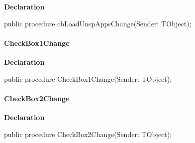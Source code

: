 \documentclass{report}
\newif\ifpdf
\begin{document}
\label{settings.TForm2-cbLoadUnspAppsChange}
\begin{list}{}{
\setlength{\itemindent}{0cm}
\setlength{\listparindent}{0cm}
\setlength{\leftmargin}{\evensidemargin}
\addtolength{\leftmargin}{\tmplength}
\settowidth{\labelsep}{X}
\addtolength{\leftmargin}{\labelsep}
\setlength{\labelwidth}{\tmplength}
}
\item[\textbf{Declaration}\hfill]
\ifpdf
\begin{flushleft}
\fi
\begin{ttfamily}
public procedure cbLoadUnspAppsChange(Sender: TObject);\end{ttfamily}

\ifpdf
\end{flushleft}
\fi

\end{list}
\paragraph*{CheckBox1Change}\hspace*{\fill}

\label{settings.TForm2-CheckBox1Change}
\begin{list}{}{
\setlength{\itemindent}{0cm}
\setlength{\listparindent}{0cm}
\setlength{\leftmargin}{\evensidemargin}
\addtolength{\leftmargin}{\tmplength}
\settowidth{\labelsep}{X}
\addtolength{\leftmargin}{\labelsep}
\setlength{\labelwidth}{\tmplength}
}
\item[\textbf{Declaration}\hfill]
\ifpdf
\begin{flushleft}
\fi
\begin{ttfamily}
public procedure CheckBox1Change(Sender: TObject);\end{ttfamily}

\ifpdf
\end{flushleft}
\fi

\end{list}
\paragraph*{CheckBox2Change}\hspace*{\fill}

\label{settings.TForm2-CheckBox2Change}
\begin{list}{}{
\setlength{\itemindent}{0cm}
\setlength{\listparindent}{0cm}
\setlength{\leftmargin}{\evensidemargin}
\addtolength{\leftmargin}{\tmplength}
\settowidth{\labelsep}{X}
\addtolength{\leftmargin}{\labelsep}
\setlength{\labelwidth}{\tmplength}
}
\item[\textbf{Declaration}\hfill]
\ifpdf
\begin{flushleft}
\fi
\begin{ttfamily}
public procedure CheckBox2Change(Sender: TObject);\end{ttfamily}

\ifpdf
\end{flushleft}
\fi

\end{list}
\end{document}
